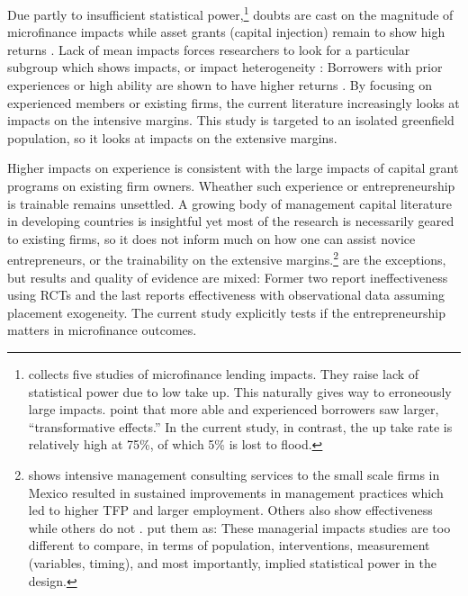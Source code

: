 	Due partly to insufficient statistical power,\footnote{\citet{BanerjeeKarlanZinman2015} collects five studies of microfinance lending impacts. They raise lack of statistical power due to low take up. This naturally gives way to erroneously large impacts. \citet{BanerjeeKarlanZinman2015} point that more able and experienced borrowers saw larger, ``transformative effects.'' In the current study, in contrast, the up take rate is relatively high at 75\%, of which 5\% is lost to flood.  } doubts are cast on the magnitude of microfinance impacts \citep{BanerjeeKarlanZinman2015, DuvendackMader2019, Meager2019} while asset grants (capital injection) remain to show high returns \citep{deMel2008, DeMel2014, FafchampsFlypaper2014, BandieraBRAC2017}. Lack of mean impacts forces researchers to look for a particular subgroup which shows impacts, or impact heterogeneity \citep{Banerjee2017HyderabadFollowup}: Borrowers with prior experiences or high ability are shown to have higher returns \citep{Banerjee2015Miracle, Mckenzie2017Spurring, Buera2017}. By focusing on experienced members or existing firms, the current literature increasingly looks at impacts on the intensive margins. This study is targeted to an isolated greenfield population, so it looks at impacts on the extensive margins.

	Higher impacts on experience is consistent with the large impacts of capital grant programs on existing firm owners. Wheather such experience or entrepreneurship is trainable remains unsettled. A growing body of management capital literature in developing countries is insightful yet most of the research is necessarily geared to existing firms, so it does not inform much on how one can assist novice entrepreneurs, or the trainability on the extensive margins.\footnote{\citet{BruhnKarlanSchoar2018} shows intensive management consulting services to the small scale firms in Mexico resulted in sustained improvements in management practices which led to higher TFP and larger employment. Others also show effectiveness \citep{Calderon2011, Berge2012, Bloometal2013} while others do not \citep{Bruhn2012, KarlanKnightUdry2015}. \citet{MckenzieWoodruff2013} put them as: These managerial impacts studies are too different to compare, in terms of population, interventions, measurement (variables, timing), and most importantly, implied statistical power in the design. } \citet{KarlanValvidia2011, BruhnZia2011, Argent2014} are the exceptions, but results and quality of evidence are mixed: Former two report ineffectiveness using RCTs and the last reports effectiveness with observational data assuming placement exogeneity.  The current study explicitly tests if the entrepreneurship matters in microfinance outcomes. %

